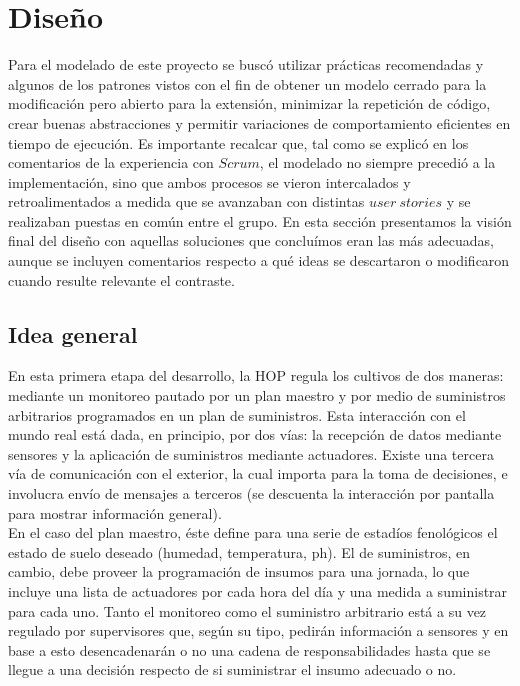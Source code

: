 \section{Diseño}

Para el modelado de este proyecto se buscó utilizar prácticas recomendadas y algunos de los patrones vistos con el fin de obtener un modelo cerrado para la modificación pero abierto para la extensión, minimizar la repetición de código, crear buenas abstracciones y permitir variaciones de comportamiento eficientes en tiempo de ejecución. Es importante recalcar que, tal como se explicó en los comentarios de la experiencia con $Scrum$, el modelado no siempre precedió a la implementación, sino que ambos procesos se vieron intercalados y retroalimentados a medida que se avanzaban con distintas $user\ stories$ y se realizaban puestas en común entre el grupo. En esta sección presentamos la visión final del diseño con aquellas soluciones que concluímos eran las más adecuadas, aunque se incluyen comentarios respecto a qué ideas se descartaron o modificaron cuando resulte relevante el contraste.

\subsection{Idea general}

En esta primera etapa del desarrollo, la HOP regula los cultivos de dos maneras: mediante un monitoreo pautado por un plan maestro y por medio de suministros arbitrarios programados en un plan de suministros. Esta interacción con el mundo real está dada, en principio, por dos vías: la recepción de datos mediante sensores y la aplicación de suministros mediante actuadores. Existe una tercera vía de comunicación con el exterior, la cual importa para la toma de decisiones, e involucra envío de mensajes a terceros (se descuenta la interacción por pantalla para mostrar información general).\\
\indent En el caso del plan maestro, éste define para una serie de estadíos fenológicos el estado de suelo deseado (humedad, temperatura, ph). El de suministros, en cambio, debe proveer la programación de insumos para una jornada, lo que incluye una lista de actuadores por cada hora del día y una medida a suministrar para cada uno. Tanto el monitoreo como el suministro arbitrario está a su vez regulado por supervisores que, según su tipo, pedirán información a sensores y en base a esto desencadenarán o no una cadena de responsabilidades hasta que se llegue a una decisión respecto de si suministrar el insumo adecuado o no.

